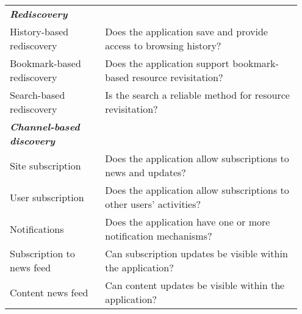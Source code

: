 \begin{table*}[htbp]
\begin{tabular}{|p{0.31\linewidth}|p{0.64\linewidth}|}
\emph{\textbf{Rediscovery}}                     &                                                                                                           \\
History-based rediscovery    & Does the application save and provide access to browsing history?                                        \\
Bookmark-based rediscovery   & Does the application support bookmark-based resource revisitation?                                        \\
Search-based rediscovery     & Is the search a reliable method for resource revisitation?                             \\

\emph{\textbf{Channel-based discovery}}          &                                                                                                           \\
Site subscription            & Does the application allow subscriptions to news and updates?                                             \\
User subscription             & Does the application allow subscriptions to other users' activities?                                      \\
Notifications                & Does the application have one or more notification mechanisms?                                                      \\
Subscription to news feed                  & Can subscription updates be visible within the application?  \\
Content news feed                  & Can content updates be visible within the application? \\

\hline     

         
\end{tabular}
\end{table*}


